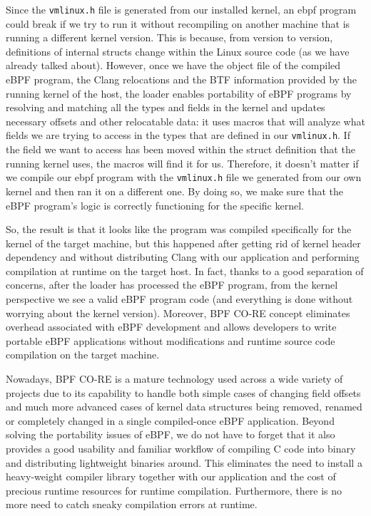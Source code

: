 Since the \colorbox{backcolour}{\lstinline[style=commandline, language=bash, breaklines=true]|vmlinux.h|} file is generated from our installed kernel, an ebpf program could break if we try to run it without recompiling on another machine that is running a different kernel version. 
This is because, from version to version, definitions of internal structs change within the Linux source code (as we have already talked about).
However, once we have the object file of the compiled eBPF program, the Clang relocations and the BTF information provided by the running kernel of the host, the loader enables portability of eBPF programs by resolving and matching all the types and fields in the kernel and updates necessary offsets and other relocatable data: it uses macros that will analyze what fields we are trying to access in the types that are defined in our \colorbox{backcolour}{\lstinline[style=commandline, language=bash, breaklines=true]|vmlinux.h|}. 
If the field we want to access has been moved within the struct definition that the running kernel uses, the macros will find it for us. 
Therefore, it doesn't matter if we compile our ebpf program with the \colorbox{backcolour}{\lstinline[style=commandline, language=bash, breaklines=true]|vmlinux.h|} file we generated from our own kernel and then ran it on a different one.
By doing so, we make sure that the eBPF program’s logic is correctly functioning for the specific kernel.

So, the result is that it looks like the program was compiled specifically for the kernel of the target machine, but this happened after getting rid of kernel header dependency and without distributing Clang with our application and performing compilation at runtime on the target host.
In fact, thanks to a good separation of concerns, after the loader has processed the eBPF program, from the kernel perspective we see a valid eBPF program code (and everything is done without worrying about the kernel version).
Moreover, BPF CO-RE concept eliminates overhead associated with eBPF development and allows developers to write portable eBPF applications without modifications and runtime source code compilation on the target machine.

Nowadays, BPF CO-RE is a mature technology used across a wide variety of projects due to its capability to handle both simple cases of changing field offsets and much more advanced cases of kernel data structures being removed, renamed or completely changed in a single compiled-once eBPF application.
Beyond solving the portability issues of eBPF, we do not have to forget that it also provides a good usability and familiar workflow of compiling C code into binary and distributing lightweight binaries around. 
This eliminates the need to install a heavy-weight compiler library together with our application and the cost of precious runtime resources for runtime compilation. 
Furthermore, there is no more need to catch sneaky compilation errors at runtime.

